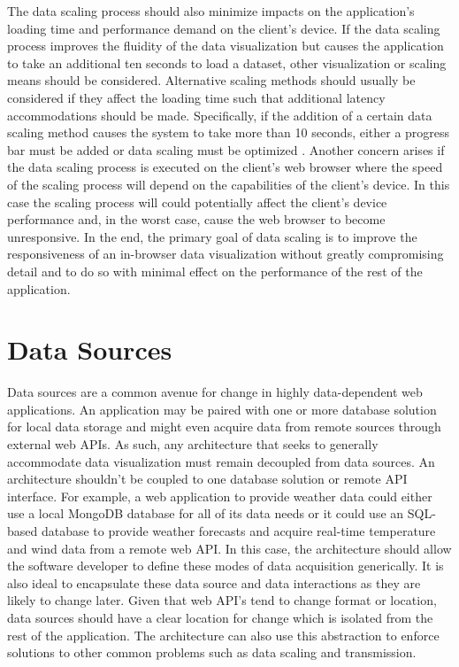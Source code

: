 The data scaling process should also minimize impacts on the application’s loading time and performance demand on the client’s device.  If the data scaling process improves the fluidity of the data visualization but causes the application to take an additional ten seconds to load a dataset, other visualization or scaling means should be considered.  Alternative scaling methods should usually be considered if they affect the loading time such that additional latency accommodations should be made.  Specifically, if the addition of a certain data scaling method causes the system to take more than 10 seconds, either a progress bar must be added or data scaling must be optimized \cite{doet, aboutface}.  Another concern arises if the data scaling process is executed on the client’s web browser where the speed of the scaling process will depend on the capabilities of the client’s device.  In this case the scaling process will could potentially affect the client’s device performance and, in the worst case, cause the web browser to become unresponsive. In the end, the primary goal of data scaling is to improve the responsiveness of an in-browser data visualization without greatly compromising detail and to do so with minimal effect on the performance of the rest of the application. \par

\section{Data Sources}
Data sources are a common avenue for change in highly data-dependent web applications. An application may be paired with one or more database solution for local data storage and might even acquire data from remote sources through external web APIs.  As such, any architecture that seeks to generally accommodate data visualization must remain decoupled from data sources. An architecture shouldn’t be coupled to one database solution or remote API interface.  For example, a web application to provide weather data could either use a local MongoDB database for all of its data needs or it could use an SQL-based database to provide weather forecasts and acquire real-time temperature and wind data from a remote web API.  In this case, the architecture should allow the software developer to define these modes of data acquisition generically.  It is also ideal to encapsulate these data source and data interactions as they are likely to change later.  Given that web API’s tend to change format or location, data sources should have a clear location for change which is isolated from the rest of the application. The architecture can also use this abstraction to enforce solutions to other common problems such as data scaling and transmission. \par

